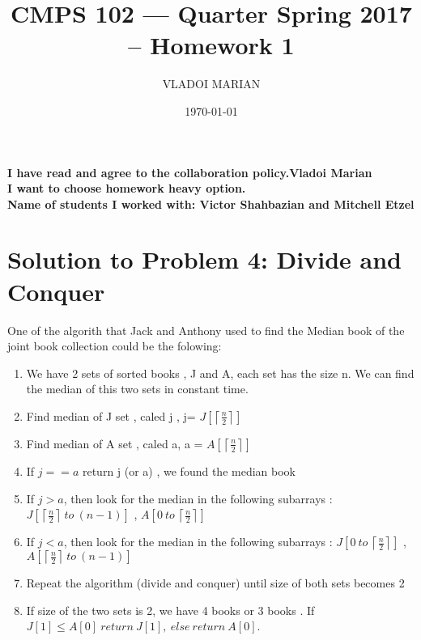 \documentclass[11pt]{article}
\title{ CMPS 102 --- Quarter  Spring 2017 --  Homework 1}
\author{VLADOI MARIAN}
\date{\today}
\begin{document}
\maketitle


\begin{center}
{\bf I have read and agree to the collaboration policy.Vladoi Marian}\\
{\bf I want to choose homework heavy option.}\\
{\bf Name of students I worked with: Victor Shahbazian and Mitchell Etzel }
\end{center}

\section*{Solution to Problem 4: Divide and Conquer}

One of the algorith that Jack and Anthony used to find the Median book of the joint book collection could be the folowing:
\begin{enumerate}
 \item We have 2 sets of sorted books , J and A, each set has the size n.
 We can find the median of this two sets in constant time. 
\item Find  median of J set , caled j ,   j= $J[ \left \lceil{\frac{n}{2}}\right \rceil  ]$  
 \item Find median of A set , caled a,  a = $A[ \left \lceil{\frac{n}{2}}\right \rceil  ]$ 
 \item  If $j == a$  return j (or a) , we found the median book 
 \item  If  $j > a$, then look for the median in the following subarrays : $J[ \left \lceil{\frac{n}{2}}\right \rceil  \ to \ (n-1) ]$ ,  $A[ 0 \ to \  \left \lceil{\frac{n}{2}}\right \rceil  ]$ 
 \item If  $j <  a$, then look for the median in the following subarrays : $J[ 0 \ to \ \left \lceil{\frac{n}{2}}\right \rceil]$ ,  $A[  \left \lceil{\frac{n}{2}}\right \rceil \ to \ (n-1) ]$ 
 \item Repeat the algorithm (divide and conquer) until size of both sets becomes 2
 \item If size of the two sets  is 2, we have 4 books or 3 books  . If $J[1] \leq  A[0] \ return \  J[1], \ else \    return  \  A[0] $.\\

 

  
\end{enumerate}
\end{document}
